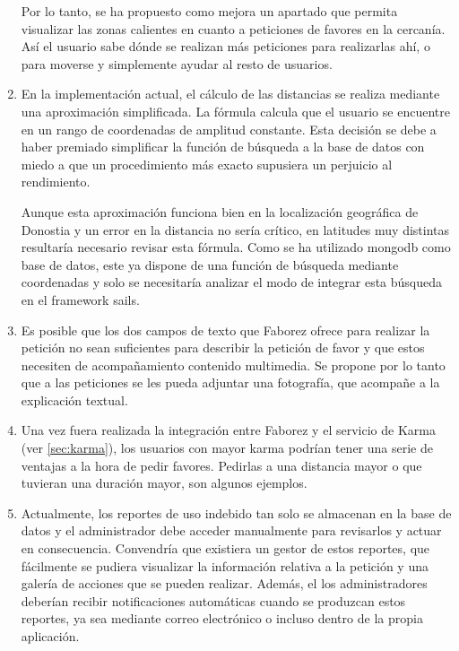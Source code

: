 \documentclass[main]{subfiles}
\begin{document}
\begin{enumerate}
  Por lo tanto, se ha propuesto como mejora un apartado que permita visualizar las zonas calientes en cuanto a peticiones de favores en la cercanía. Así el usuario sabe dónde se realizan más peticiones para realizarlas ahí, o para moverse y simplemente ayudar al resto de usuarios.
  
  \item En la implementación actual, el cálculo de las distancias se realiza mediante una aproximación simplificada. La fórmula calcula que el usuario se encuentre en un rango de coordenadas de amplitud constante. Esta decisión se debe a haber premiado simplificar la función de búsqueda a la base de datos con miedo a que un procedimiento más exacto supusiera un perjuicio al rendimiento.
  
  Aunque esta aproximación funciona bien en la localización geográfica de Donostia y un error en la distancia no sería crítico, en latitudes muy distintas resultaría necesario revisar esta fórmula. Como se ha utilizado \gls{mongodb} como base de datos, este ya dispone de una función de búsqueda mediante coordenadas y solo se necesitaría analizar el modo de integrar esta búsqueda en el framework \gls{sails}.
  
  \item Es posible que los dos campos de texto que Faborez ofrece para realizar la petición no sean suficientes para describir la petición de favor y que estos necesiten de acompañamiento contenido multimedia. Se propone por lo tanto que a las peticiones se les pueda adjuntar una fotografía, que acompañe a la explicación textual.
  
  \item Una vez fuera realizada la integración entre Faborez y el servicio de Karma (ver \cref{sec:karma}), los usuarios con mayor karma podrían tener una serie de ventajas a la hora de pedir favores. Pedirlas a una distancia mayor o que tuvieran una duración mayor, son algunos ejemplos.
  
  \item Actualmente, los reportes de uso indebido tan solo se almacenan en la base de datos y el administrador debe acceder manualmente para revisarlos y actuar en consecuencia. Convendría que existiera un gestor de estos reportes, que fácilmente se pudiera visualizar la información relativa a la petición y una galería de acciones que se pueden realizar. Además, el los administradores deberían recibir notificaciones automáticas cuando se produzcan estos reportes, ya sea mediante correo electrónico o incluso dentro de la propia aplicación.
  

\end{enumerate}
\end{document}
